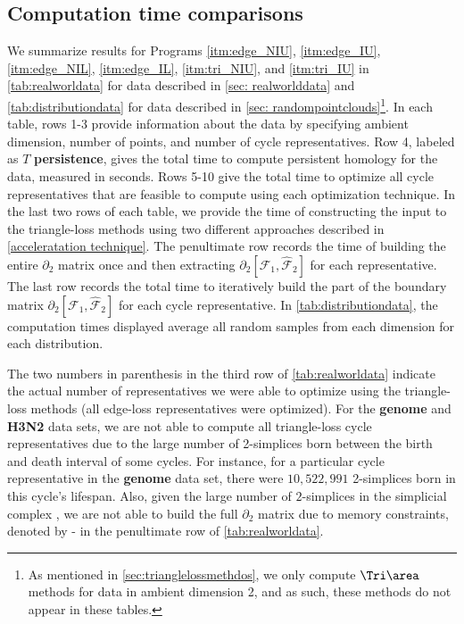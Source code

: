 \subsection{Computation time comparisons} 
\label{sec:timecomparisons}

We summarize results for Programs \ref{itm:edge_NIU}, \ref{itm:edge_IU}, \ref{itm:edge_NIL},
\ref{itm:edge_IL},
\ref{itm:tri_NIU}, and 
\ref{itm:tri_IU} in \tab \ref{tab:realworldata} for data described in \se \ref{sec: realworlddata} and \tab \ref{tab:distributiondata} for data described in \se \ref{sec: randompointclouds}\footnote{As mentioned in \se \ref{sec:trianglelossmethdos}, we only compute $\Tri\area$ methods for data in ambient dimension 2, and as such, these methods do not appear in these tables.}. In each table, rows 1-3 provide information about the data by specifying ambient dimension, number of points, and number of cycle representatives. Row 4, labeled as $T$ \textbf{persistence}, gives the total time to compute persistent homology for the data, measured in seconds. Rows 5-10 give the total time to optimize all cycle representatives that are feasible to compute using each optimization technique. In the last two rows of each table, we provide the time of constructing the input to the triangle-loss methods using two different approaches described in \se \ref{acceleratation technique}. The penultimate row records the time of building the entire $\partial_{2}$ matrix once and then extracting $\partial_2[\mathcal{F}_1, \hat {\mathcal{F}}_{2}]$ for each representative. The last row records the total time to iteratively build the part of the boundary matrix $\partial_{2}[ \mathcal{F}_1 , \hat {\mathcal{F}}_{2} ]$ for each cycle representative. In \tab \ref{tab:distributiondata}, the computation times displayed average all random samples from each dimension for each distribution. 

The two numbers in parenthesis in the third row of \tab \ref{tab:realworldata} indicate the actual number of representatives we were able to optimize using the triangle-loss methods (all edge-loss representatives were optimized). For the \textbf{genome} and \textbf{H3N2} data sets, we are not able to compute all triangle-loss cycle representatives due to the large number of 2-simplices born between the birth and death interval of some cycles. For instance, for a particular cycle representative in the \textbf{genome} data set, there were $10,522,991$ 2-simplices born in this cycle's lifespan. %
Also, given the large number of $2$-simplices in the simplicial complex%
, we are not able to build the full $\partial_2$ matrix due to memory constraints, denoted by - in the penultimate row of \tab \ref{tab:realworldata}. 

